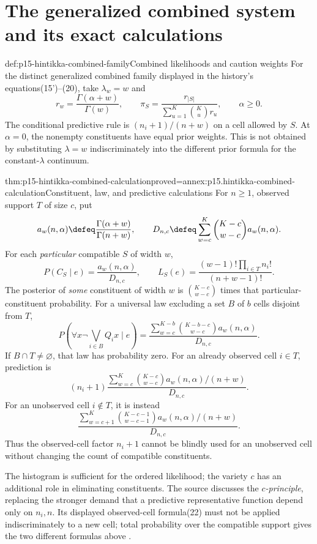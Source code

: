 \section{The generalized combined system and its exact calculations}
\label{sec:p15-hintikka-combined}

\begin{hbdefinition}{def:p15-hintikka-combined-family}{Combined likelihoods and caution weights}
For the distinct generalized combined family displayed in the history's
equations(15')--(20), take \(\lambda_w=w\) and
\[
 r_w=\frac{\Gamma(\alpha+w)}{\Gamma(w)},\qquad
 \pi_S=\frac{r_{|S|}}{\sum_{u=1}^K\binom Ku r_u},
 \qquad\alpha\geq0.
\]
The conditional predictive rule is \((n_i+1)/(n+w)\) on a cell
allowed by \(S\). At \(\alpha=0\), the nonempty constituents
have equal prior weights. This is not obtained by substituting
\(\lambda=w\) indiscriminately into the different prior formula
for the constant-\(\lambda\) continuum.
\end{hbdefinition}

\begin{hbtheorem}{thm:p15-hintikka-combined-calculation}{proved=annex:p15.hintikka-combined-calculation}{Constituent, law, and predictive calculations}
For \(n\geq1\), observed support \(T\) of size \(c\), put
\[
 a_w(n,\alpha)\defeq\frac{\Gamma(\alpha+w)}{\Gamma(n+w)},
 \qquad
 D_{n,c}\defeq\sum_{w=c}^K\binom{K-c}{w-c}a_w(n,\alpha).
\]
For each \emph{particular} compatible \(S\) of width \(w\),
\[
 P(C_S\mid e)=\frac{a_w(n,\alpha)}{D_{n,c}},\qquad
 L_S(e)=\frac{(w-1)!\prod_{i\in T}n_i!}{(n+w-1)!}.
\]
The posterior of \emph{some} constituent of width \(w\) is
\(\binom{K-c}{w-c}\) times that particular-constituent probability.
For a universal law excluding a set \(B\) of \(b\) cells disjoint
from \(T\),
\[
 P(\forall x\neg\bigvee_{i\in B}Q_ix\mid e)
 =\frac{\displaystyle\sum_{w=c}^{K-b}
                  \binom{K-b-c}{w-c}a_w(n,\alpha)}{D_{n,c}}.
\]
If \(B\cap T\ne\varnothing\), that law has probability zero.
For an already observed cell \(i\in T\), prediction is
\[
 (n_i+1)\frac{\displaystyle\sum_{w=c}^K
               \binom{K-c}{w-c}a_w(n,\alpha)/(n+w)}{D_{n,c}}.
\]
For an unobserved cell \(i\notin T\), it is instead
\[
 \frac{\displaystyle\sum_{w=c+1}^K
       \binom{K-c-1}{w-c-1}a_w(n,\alpha)/(n+w)}{D_{n,c}}.
\]
Thus the observed-cell factor \(n_i+1\) cannot be blindly used for
an unobserved cell without changing the count of compatible constituents.
\end{hbtheorem}

The histogram is sufficient for the ordered likelihood; the variety
\(c\) has an additional role in eliminating constituents. The source
discusses the \emph{\(c\)-principle}, replacing the stronger demand
that a predictive representative function depend only on \(n_i,n\).
Its displayed observed-cell formula(22) must not be applied indiscriminately
to a new cell; total probability over the compatible support gives the
two different formulas above
\cite[pp.~319--325]{Niiniluoto2011HintikkaProgramReading}.

